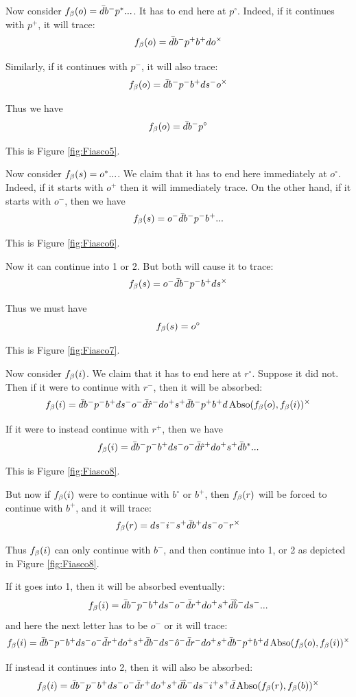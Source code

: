 Now consider $f_\beta(o) = \bar{d} b^- p^*...$. It has to end here at $p^\circ$. Indeed, if it continues with $p^+$, it will trace:
\[
f_\beta(o) = \bar{d} b^- p^+ b^+ d o^\times
\]

Similarly, if it continues with $p^-$, it will also trace:
\[
f_\beta(o) = \bar{d} b^- p^- b^+ d s^- o^\times
\]

Thus we have
\[
f_\beta(o) = \bar{d} b^- p^\circ
\]

This is Figure \ref{fig:Fiasco5}.

Now consider $f_\beta(s) = o^*...$. We claim that it has to end here immediately at $o^\circ$. Indeed, if it starts with $o^+$ then it will immediately trace. On the other hand, if it starts with $o^-$, then we have
\[
f_\beta(s) = o^- \bar{d} b^- p^- b^+...
\]

This is Figure \ref{fig:Fiasco6}.

Now it can continue into 1 or 2. But both will cause it to trace:
\[
f_\beta(s) = o^- \bar{d} b^- p^- b^+ d s^\times
\]

Thus we must have
\[
f_\beta(s) = o^\circ
\]

This is Figure \ref{fig:Fiasco7}.

Now consider  $f_\beta(i)$. We claim that it has to end here at $r^\circ$. Suppose it did not. Then if it were to continue with $r^-$, then it will be absorbed:
\[
f_\beta(i) = \bar{d} b^- p^- b^+ d s^- o^- \bar{d} \hat{r}^- d o^+ s^+ \bar{d} b^- p^+ b^+ d \operatorname{Abso}(f_\beta(o), f_\beta(i))^\times
\]

If it were to instead continue with $r^+$, then we have
\[
f_\beta(i) = \bar{d} b^- p^- b^+ d s^- o^- \bar{d} \hat{r}^+ d o^+ s^+ \bar{d} b^*...
\]

This is Figure \ref{fig:Fiasco8}.

But now if $f_\beta(i)$ were to continue with $b^\circ$ or $b^+$, then $f_\beta(r)$ will be forced to continue with $b^+$, and it will trace:
\[
f_\beta(r) = d s^- i^- s^+ \bar{d} b^+ d s^- o^- r^\times
\]

Thus $f_\beta(i)$ can only continue with $b^-$, and then continue into 1, or 2 as depicted in Figure \ref{fig:Fiasco8}.

If it goes into 1, then it will be absorbed eventually:
\[
f_\beta(i) = \bar{d} b^- p^- b^+ d s^- o^- \bar{d} r^+ d o^+ s^+ \bar{d} \hat{b}^- d s^-...
\]
and here the next letter has to be $o^-$ or it will trace:
\[
f_\beta(i) = \bar{d} b^- p^- b^+ d s^- o^- \bar{d} r^+ d o^+ s^+ \bar{d} b^- d s^- \hat{o}^- \bar{d} r^- d o^+ s^+ \bar{d} b^- p^+ b^+ d \operatorname{Abso}(f_\beta(o), f_\beta(i))^\times
\]

If instead it continues into 2, then it will also be absorbed:
\[
f_\beta(i) = \bar{d} b^- p^- b^+ d s^- o^- \bar{d} r^+ d o^+ s^+ \bar{d} \hat{b}^- d s^- i^+ s^+ \bar{d} \operatorname{Abso}(f_\beta(r), f_\beta(b))^\times
\]

